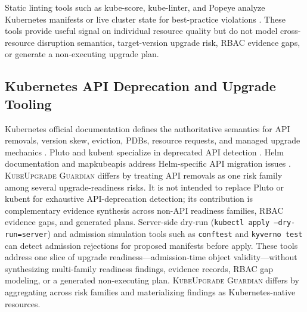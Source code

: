 \documentclass[10pt,journal]{IEEEtran}
\newcommand{\tool}{\textsc{KubeUpgrade Guardian}}
\newcommand{\code}[1]{\texttt{#1}}
\begin{document}
Static linting tools such as kube-score, kube-linter, and Popeye analyze Kubernetes manifests or live cluster state for best-practice violations \cite{kubeScore,kubeLinter,popeye}. These tools provide useful signal on individual resource quality but do not model cross-resource disruption semantics, target-version upgrade risk, RBAC evidence gaps, or generate a non-executing upgrade plan.

\subsection{Kubernetes API Deprecation and Upgrade Tooling}
Kubernetes official documentation defines the authoritative semantics for API removals, version skew, eviction, PDBs, resource requests, and managed upgrade mechanics \cite{kubernetesDeprecationPolicy,kubernetesDeprecationGuide,kubernetesVersionSkew,kubernetesEviction,kubernetesDisruptions,kubernetesResourceManagement,aksUpgradeOptions,aksNodeImage,aksDay2}. Pluto and kubent specialize in deprecated API detection \cite{pluto,kubent}. Helm documentation and mapkubeapis address Helm-specific API migration issues \cite{helmKubernetesApis,helmMapKubeApis}. \tool{} differs by treating API removals as one risk family among several upgrade-readiness risks. It is not intended to replace Pluto or kubent for exhaustive API-deprecation detection; its contribution is complementary evidence synthesis across non-API readiness families, RBAC evidence gaps, and generated plans. Server-side dry-run (\code{kubectl apply --dry-run=server}) and admission simulation tools such as \code{conftest} and \code{kyverno test} can detect admission rejections for proposed manifests before apply. These tools address one slice of upgrade readiness---admission-time object validity---without synthesizing multi-family readiness findings, evidence records, RBAC gap modeling, or a generated non-executing plan. \tool{} differs by aggregating across risk families and materializing findings as Kubernetes-native resources.
\end{document}
